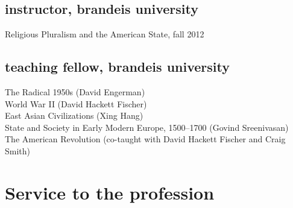 \documentclass[11pt]{article}
\begin{document}
\subsection{instructor, brandeis university}

Religious Pluralism and the American State, fall 2012

\subsection{teaching fellow, brandeis university}

The Radical 1950s (David Engerman)\\
World War II (David Hackett Fischer)\\
East Asian Civilizations (Xing Hang)\\
State and Society in Early Modern Europe, 1500--1700
(Govind Sreenivasan)\\
The American Revolution (co-taught with David Hackett 
Fischer and Craig Smith)





\section{Service to the profession}
\end{document}
